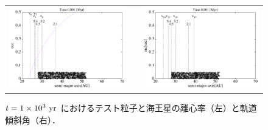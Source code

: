 \documentclass[11pt,a4paper,oneside,onecolumn]{jreport}
\begin{document}
\begin{figure}[H]
\begin{tabular}{ccc}
\begin{minipage}[t]{0.45\hsize}
\centering
\includegraphics[width=8cm]{./image/kuiper_ecc_1kyr.pdf}
\end{minipage} &
\begin{minipage}[t]{0.1\hsize}
\end{minipage} &
\begin{minipage}[t]{0.45\hsize}
\centering
\includegraphics[width=8cm]{./image/kuiper_inc_1kyr.pdf}
\end{minipage}\\
%
\end{tabular}
\caption{$t = 1 \times 10^3\ {\rm yr}$ におけるテスト粒子と海王星の離心率（左）と軌道傾斜角（右）．\label{fig:kuiper_ecc_inc_1kyr}}
\end{figure}
\end{document}
